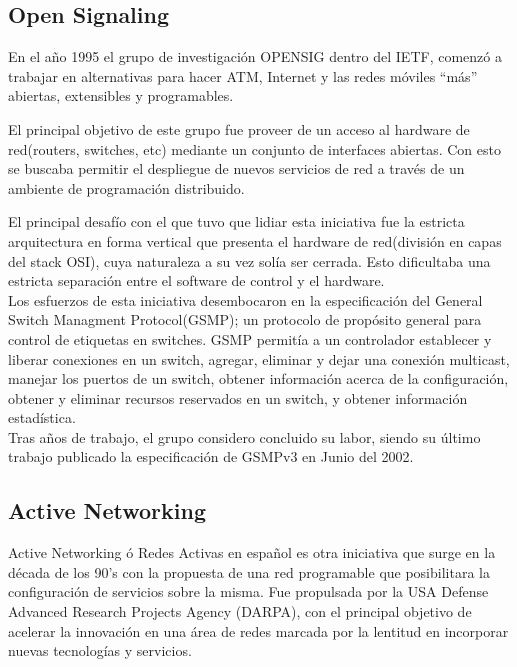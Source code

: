 \subsection{Open Signaling}
En el año 1995 el grupo de investigación OPENSIG\cite{campbell1999open} dentro del IETF, comenzó a trabajar en alternativas para hacer ATM, Internet y las redes móviles ``más'' abiertas, extensibles y programables.

El principal objetivo de este grupo fue proveer de un acceso al hardware de red(routers, switches, etc) mediante un conjunto de interfaces abiertas. Con esto se buscaba permitir el despliegue de nuevos servicios de red a través de un ambiente de programación distribuido.

El principal desafío con el que tuvo que lidiar esta iniciativa fue la estricta arquitectura en forma vertical que presenta el hardware de red(división en capas del stack OSI), cuya naturaleza a su vez solía ser cerrada. Esto dificultaba una estricta separación entre el software de control y el hardware.\\

Los esfuerzos de esta iniciativa desembocaron en la especificación del General Switch Managment Protocol(GSMP); un protocolo de propósito general para control de etiquetas en switches.
GSMP permitía a un controlador establecer y liberar conexiones en un switch, agregar, eliminar
y dejar una conexión multicast, manejar los puertos de un switch, obtener información acerca de la configuración, obtener y eliminar recursos reservados en un switch, y obtener información estadística.\\

Tras años de trabajo, el grupo considero concluido su labor, siendo su último trabajo publicado la especificación de GSMPv3 en Junio del 2002\cite{doria2002general}.

\subsection{Active Networking}
Active Networking\citep{tennenhouse1997survey}\citep{tennenhouse2002towards}\citep{moore2001towards} \'o Redes Activas en español es otra iniciativa que surge en la década de los 90's con la propuesta de una red programable que posibilitara la configuración de servicios sobre la misma. Fue propulsada por la USA Defense Advanced Research Projects Agency (DARPA), con el principal objetivo de acelerar la innovación en una área de redes marcada por la lentitud en incorporar nuevas tecnologías y servicios.\\


